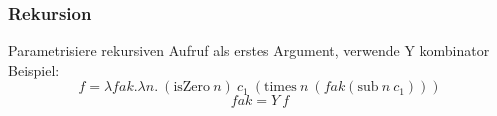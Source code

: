 \subsubsection{Rekursion}
Parametrisiere rekursiven Aufruf als erstes Argument, verwende Y kombinator\\
Beispiel:\\
$$f = \lambda fak. \lambda n. \medspace (\text{isZero}\medspace n)  \medspace c_1 \medspace (\text{times} \medspace n \medspace (fak (\text{sub}\medspace n \medspace c_1)))$$
$$fak = Y \medspace f$$